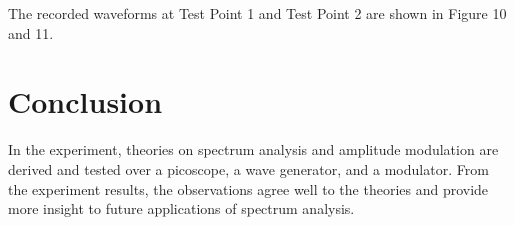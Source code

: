 \documentclass[12pt]{article}[times]
\begin{document}
The recorded waveforms at Test Point 1 and Test Point 2 are 
shown in Figure 10 and 11.



\section{Conclusion}

In the experiment, theories on spectrum analysis and amplitude 
modulation are derived and 
tested over a picoscope, a wave generator, and a modulator.
From the experiment results, the observations agree well to the
theories and provide more insight to future applications of 
spectrum analysis.
\end{document}
